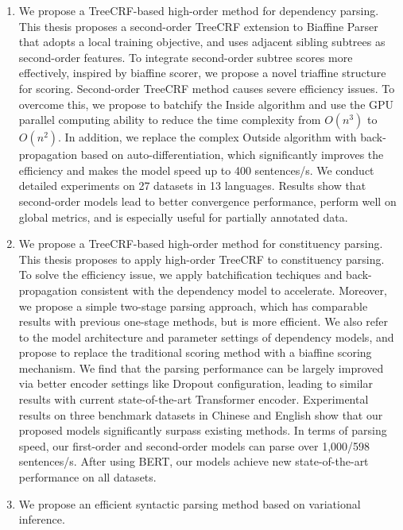 \begin{eabstract}
  \begin{enumerate}
    \item We propose a TreeCRF-based high-order method for dependency parsing.
          This thesis proposes a second-order TreeCRF extension to Biaffine Parser that adopts a local training objective, and uses adjacent sibling subtrees as second-order features.
          To integrate second-order subtree scores more effectively, inspired by biaffine scorer, we propose a novel triaffine structure for scoring.
          Second-order TreeCRF method causes severe efficiency issues.
          To overcome this, we propose to batchify the Inside algorithm and use the GPU parallel computing ability to reduce the time complexity from $O(n^3)$ to $O(n^2)$.
          In addition, we replace the complex Outside algorithm with back-propagation based on auto-differentiation, which significantly improves the efficiency and makes the model speed up to 400 sentences/s.
          We conduct detailed experiments on 27 datasets in 13 languages.
          Results show that second-order models lead to better convergence performance, perform well on global metrics, and is especially useful for partially annotated data.
    \item We propose a TreeCRF-based high-order method for constituency parsing.
          This thesis proposes to apply high-order TreeCRF to constituency parsing.
          To solve the efficiency issue, we apply batchification techiques and back-propagation consistent with the dependency model to accelerate.
          Moreover, we propose a simple two-stage parsing approach, which has comparable results with previous one-stage methods, but is more efficient.
          We also refer to the model architecture and parameter settings of dependency models, and propose to replace the traditional scoring method with a biaffine scoring mechanism.
          We find that the parsing performance can be largely improved via better encoder settings like Dropout configuration, leading to similar results with current state-of-the-art Transformer encoder.
          Experimental results on three benchmark datasets in Chinese and English show that our proposed models significantly surpass existing methods.
          In terms of parsing speed, our first-order and second-order models can parse over 1,000/598 sentences/s.
          After using BERT, our models achieve new state-of-the-art performance on all datasets.
    \item We propose an efficient syntactic parsing method based on variational inference.

\end{enumerate}
\end{eabstract}
